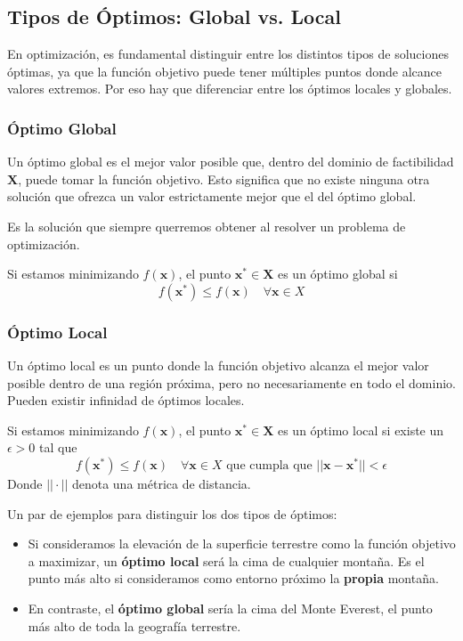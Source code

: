 \documentclass[12pt,a4paper]{book}
\begin{document}
\subsection{Tipos de Óptimos: Global vs. Local}

En optimización, es fundamental distinguir entre los distintos tipos de soluciones óptimas, ya que la función objetivo puede tener múltiples puntos donde alcance valores extremos. Por eso hay que diferenciar entre los óptimos locales y globales.

\subsubsection{Óptimo Global}
Un óptimo global es el mejor valor posible que, dentro del dominio de factibilidad $\mathbf{X}$, puede tomar la función objetivo. Esto significa que no existe ninguna otra solución que ofrezca un valor estrictamente mejor que el del óptimo global.

Es la solución que siempre querremos obtener al resolver un problema de optimización.

Si estamos minimizando $f(\mathbf{x})$, el punto $\mathbf{x}^* \in \mathbf{X}$ es un óptimo global si
$$f(\mathbf{x}^*)\leq f(\mathbf{x}) \quad \forall \mathbf{x}\in X$$

\subsubsection{Óptimo Local}
Un óptimo local es un punto donde la función objetivo alcanza el mejor valor posible dentro de una región próxima, pero no necesariamente en todo el dominio. Pueden existir infinidad de óptimos locales.

Si estamos minimizando $f(\mathbf{x})$, el punto $\mathbf{x}^* \in \mathbf{X}$ es un óptimo local si existe un $\epsilon>0$ tal que
$$f(\mathbf{x}^*)\leq f(\mathbf{x}) \quad \forall \mathbf{x}\in X \text{ que cumpla que }||\mathbf{x}-\mathbf{x}^*||<\epsilon$$
Donde $||\cdot||$ denota una métrica de distancia.

Un par de ejemplos para distinguir los dos tipos de óptimos:
\begin{itemize}
    \item Si consideramos la elevación de la superficie terrestre como la función objetivo a maximizar, un \textbf{óptimo local} será la cima de cualquier montaña. Es el punto más alto si consideramos como entorno próximo la \textbf{propia} montaña.
    \item En contraste, el \textbf{óptimo global} sería la cima del Monte Everest, el punto más alto de toda la geografía terrestre.
\end{itemize}
\end{document}
